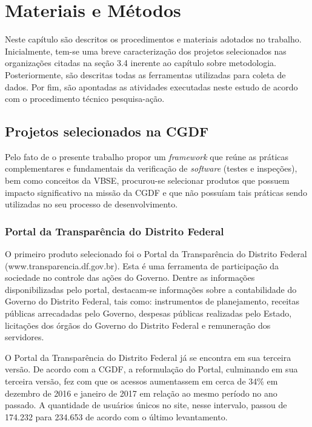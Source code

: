 \chapter{Materiais e Métodos}

Neste capítulo são descritos os procedimentos e materiais adotados no trabalho. Inicialmente, tem-se uma breve caracterização dos projetos selecionados nas organizações citadas na seção 3.4 inerente ao capítulo sobre metodologia. Posteriormente, são descritas todas as ferramentas utilizadas para coleta de dados. Por fim, são apontadas as atividades executadas neste estudo de acordo com o procedimento técnico pesquisa-ação.

\section{Projetos selecionados na CGDF}

Pelo fato de o presente trabalho propor um \textit{framework} que reúne as práticas complementares e fundamentais da verificação de \textit{software} (testes e inspeções), bem como conceitos da VBSE, procurou-se selecionar produtos que possuem impacto significativo na missão da CGDF e que não possuíam tais práticas sendo utilizadas no seu processo de desenvolvimento.

\subsection{Portal da Transparência do Distrito Federal}

O primeiro produto selecionado foi o Portal da Transparência do Distrito Federal (www.transparencia.df.gov.br). Esta é uma ferramenta de participação da sociedade no controle das ações do Governo. Dentre as informações disponibilizadas pelo portal, destacam-se informações sobre a contabilidade do Governo do Distrito Federal, tais como: instrumentos de planejamento, receitas públicas arrecadadas pelo Governo, despesas públicas realizadas pelo Estado, licitações dos órgãos do Governo do Distrito Federal e remuneração dos servidores.

O Portal da Transparência do Distrito Federal já se encontra em sua terceira versão. De acordo com a CGDF, a reformulação do Portal, culminando em sua terceira versão, fez com que os acessos aumentassem em cerca de 34\% em dezembro de 2016 e janeiro de 2017 em relação ao mesmo período no ano passado. A quantidade de usuários únicos no site, nesse intervalo, passou de 174.232 para 234.653 de acordo com o último levantamento.

